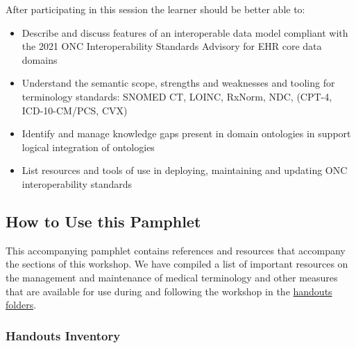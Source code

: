 \documentclass[
]{journal}
\begin{document}
After participating in this session the learner should be better able to:

\begin{itemize}
\item
  Describe and discuss features of an interoperable data model compliant with the 2021 ONC Interoperability Standards Advisory for EHR core data domains
\item
  Understand the semantic scope, strengths and weaknesses and tooling for terminology standards: SNOMED CT, LOINC, RxNorm, NDC, (CPT-4, ICD-10-CM/PCS, CVX)
\item
  Identify and manage knowledge gaps present in domain ontologies in support logical integration of ontologies
\item
  List resources and tools of use in deploying, maintaining and updating ONC interoperability standards
\end{itemize}

\hypertarget{how-to-use-this-pamphlet}{%
\subsection{How to Use this Pamphlet}\label{how-to-use-this-pamphlet}}

This accompanying pamphlet contains references and resources that accompany the sections of this workshop. We have compiled a list of important resources on the management and maintenance of medical terminology and other measures that are available for use during and following the workshop in the \href{https://github.com/UNMC-CRANE/AMIA_Workshop_May_2022/tree/main/Handouts}{handouts folders}.

\hypertarget{handouts-inventory}{%
\subsubsection{Handouts Inventory}\label{handouts-inventory}}
\end{document}
